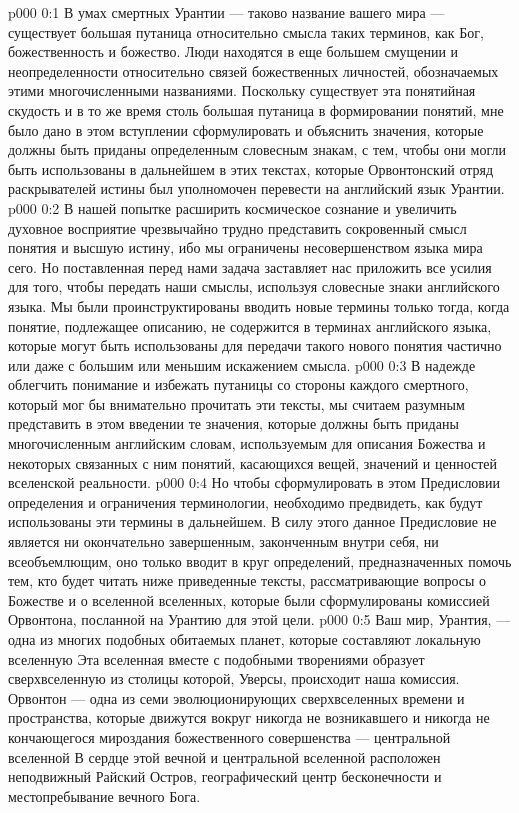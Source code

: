 \uforeword
\author{Божественный Советник}
\vs p000 0:1 В умах смертных Урантии --- таково название вашего мира --- существует большая путаница относительно смысла таких терминов, как Бог, божественность и божество. Люди находятся в еще большем смущении и неопределенности относительно связей божественных личностей, обозначаемых этими многочисленными названиями. Поскольку существует эта понятийная скудость и в то же время столь большая путаница в формировании понятий, мне было дано в этом вступлении сформулировать и объяснить значения, которые должны быть приданы определенным словесным знакам, с тем, чтобы они могли быть использованы в дальнейшем в этих текстах, которые Орвонтонский отряд раскрывателей истины был уполномочен перевести на английский язык Урантии.
\vs p000 0:2 В нашей попытке расширить космическое сознание и увеличить духовное восприятие чрезвычайно трудно представить сокровенный смысл понятия и высшую истину, ибо мы ограничены несовершенством языка мира сего. Но поставленная перед нами задача заставляет нас приложить все усилия для того, чтобы передать наши смыслы, используя словесные знаки английского языка. Мы были проинструктированы вводить новые термины только тогда, когда понятие, подлежащее описанию, не содержится в терминах английского языка, которые могут быть использованы для передачи такого нового понятия частично или даже с большим или меньшим искажением смысла.
\vs p000 0:3 В надежде облегчить понимание и избежать путаницы со стороны каждого смертного, который мог бы внимательно прочитать эти тексты, мы считаем разумным представить в этом введении те значения, которые должны быть приданы многочисленным английским словам, используемым для описания Божества и некоторых связанных с ним понятий, касающихся вещей, значений и ценностей вселенской реальности.
\vs p000 0:4 Но чтобы сформулировать в этом Предисловии определения и ограничения терминологии, необходимо предвидеть, как будут использованы эти термины в дальнейшем. В силу этого данное Предисловие не является ни окончательно завершенным, законченным внутри себя, ни всеобъемлющим, оно только вводит в круг определений, предназначенных помочь тем, кто будет читать ниже приведенные тексты, рассматривающие вопросы о Божестве и о вселенной вселенных, которые были сформулированы комиссией Орвонтона, посланной на Урантию для этой цели.
\vs p000 0:5 \pc Ваш мир, Урантия, --- одна из многих подобных обитаемых планет, которые составляют локальную вселенную  Эта вселенная вместе с подобными творениями образует сверхвселенную  из столицы которой, Уверсы, происходит наша комиссия. Орвонтон --- одна из семи эволюционирующих сверхвселенных времени и пространства, которые движутся вокруг никогда не возникавшего и никогда не кончающегося мироздания божественного совершенства --- центральной вселенной  В сердце этой вечной и центральной вселенной расположен неподвижный Райский Остров, географический центр бесконечности и местопребывание вечного Бога.
